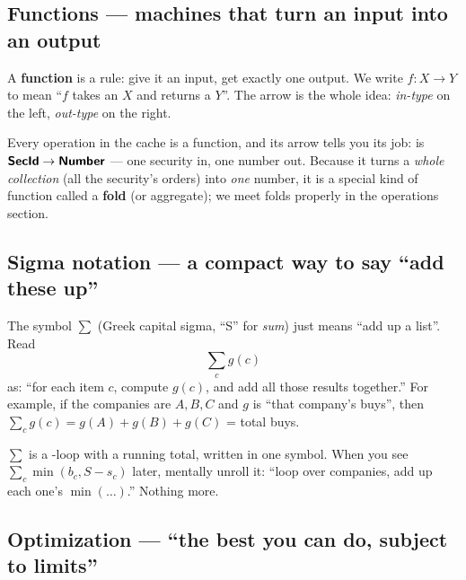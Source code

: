 \subsection{Functions --- machines that turn an input into an output}

A \textbf{function} is a rule: give it an input, get exactly one output. We write
$f : X \to Y$ to mean ``$f$ takes an $X$ and returns a $Y$''. The arrow is the
whole idea: \emph{in-type} on the left, \emph{out-type} on the right.

\begin{center}
\end{center}

Every operation in the cache is a function, and its arrow tells you its job:
 is $\textsf{\textbf{SecId}}\to\textsf{\textbf{Number}}$ --- one security in,
one number out. Because it turns a \emph{whole collection} (all the security's
orders) into \emph{one} number, it is a special kind of function called a
\textbf{fold} (or aggregate); we meet folds properly in the operations section.

\subsection{Sigma notation --- a compact way to say ``add these up''}

The symbol $\sum$ (Greek capital sigma, ``S'' for \emph{sum}) just means ``add up
a list''. Read
\[
\sum_{c} g(c)
\]
as: ``for each item $c$, compute $g(c)$, and add all those results together.''
For example, if the companies are $A,B,C$ and $g$ is ``that company's buys'', then
$\sum_c g(c) = g(A)+g(B)+g(C)$ = total buys.

\begin{intu}
$\sum$ is a -loop with a running total, written in one symbol. When you
see $\sum_c \min(b_c, S - s_c)$ later, mentally unroll it: ``loop over companies,
add up each one's $\min(\dots)$.'' Nothing more.
\end{intu}

\subsection{Optimization --- ``the best you can do, subject to limits''}

